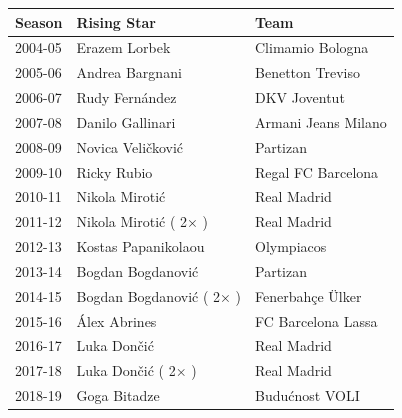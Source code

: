 \documentclass{article}
\begin{document}
\begin{tabular}{lll}
\toprule
Season & Rising Star & Team \\
\midrule
2004-05 & Erazem Lorbek & Climamio Bologna \\
2005-06 & Andrea Bargnani & Benetton Treviso \\
2006-07 & Rudy Fernández & DKV Joventut \\
2007-08 & Danilo Gallinari & Armani Jeans Milano \\
2008-09 & Novica Veličković & Partizan \\
2009-10 & Ricky Rubio & Regal FC Barcelona \\
2010-11 & Nikola Mirotić & Real Madrid \\
2011-12 & Nikola Mirotić ( 2× ) & Real Madrid \\
2012-13 & Kostas Papanikolaou & Olympiacos \\
2013-14 & Bogdan Bogdanović & Partizan \\
2014-15 & Bogdan Bogdanović ( 2× ) & Fenerbahçe Ülker \\
2015-16 & Álex Abrines & FC Barcelona Lassa \\
2016-17 & Luka Dončić & Real Madrid \\
2017-18 & Luka Dončić ( 2× ) & Real Madrid \\
2018-19 & Goga Bitadze & Budućnost VOLI \\
\bottomrule
\end{tabular}
\end{document}
